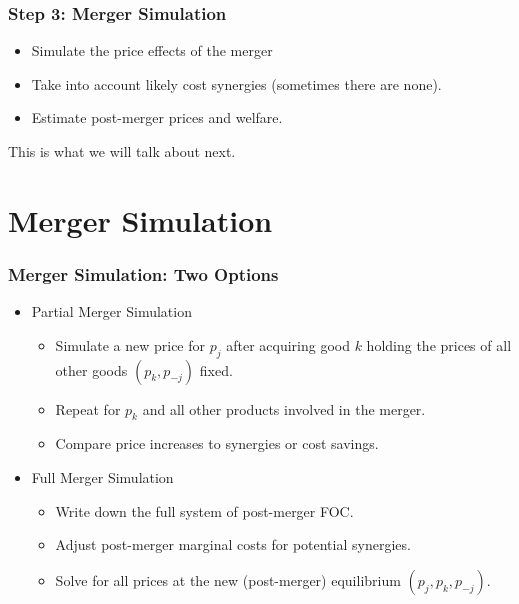 \documentclass[xcolor=pdftex,dvipsnames,table,mathserif]{beamer}
\begin{document}
\begin{frame}
\frametitle{Step 3: Merger Simulation}
 \begin{itemize}
\item Simulate the price effects of the merger
\item Take into account likely cost synergies (sometimes there are none).
\item Estimate post-merger prices and welfare.
 \end{itemize}
 This is what we will talk about next.
\end{frame}

\section{Merger Simulation}

\begin{frame}
\frametitle{Merger Simulation: Two Options}
 \begin{itemize}
\item Partial Merger Simulation
 \begin{itemize}
\item Simulate a new price for $p_j$ after acquiring good $k$ holding the prices of all other goods $(p_k,p_{-j})$ fixed.
\item Repeat for $p_k$ and all other products involved in the merger.
\item Compare price increases to \alert{synergies} or cost savings.
 \end{itemize}
 \item Full Merger Simulation
 \begin{itemize}
\item Write down the full system of post-merger FOC.
\item Adjust post-merger marginal costs for potential synergies.
\item Solve for all prices at the new (post-merger) equilibrium $(p_j,p_k,p_{-j})$.
 \end{itemize}
 \end{itemize}
\end{frame}
\end{document}
